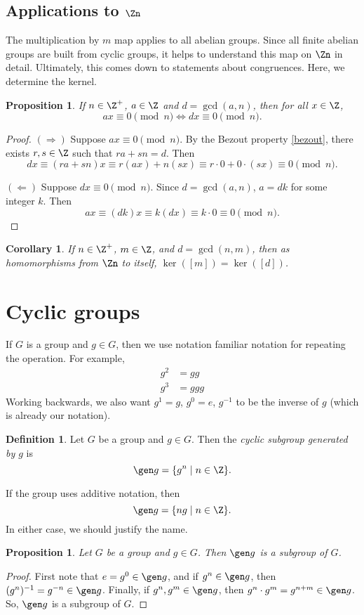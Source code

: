 \documentclass[12pt]{amsart}
\theoremstyle{plain}
\newtheorem{prop}[thm]{Proposition}
\newtheorem{cor}[thm]{Corollary}
\theoremstyle{definition}
\newtheorem{defn}[thm]{Definition}
\theoremstyle{remark}
\begin{document}
\subsection{Applications to $\Zn$}
The multiplication by $m$ map applies to all abelian groups.  Since
all finite abelian groups are built from cyclic groups, it helps to
understand this map on $\Zn$ in detail.  Ultimately, this comes down
to statements about congruences.  Here, we determine the kernel.


\begin{prop}
  If $n\in \Z^+$, $a\in \Z$ and $d=\gcd(a,n)$, then for all $x\in \Z$,
  \[ ax\equiv 0\pmod n \iff dx\equiv 0 \pmod n.\]
\end{prop}
\begin{proof}
  $(\Rightarrow)$ 
  Suppose $ax\equiv 0\pmod n$.  By the Bezout property \ref{bezout},
  there exists $r,s\in\Z$ such that $ra+sn=d$.  Then
  \[ dx\equiv (ra+sn)x \equiv r(ax)+n(sx)\equiv r\cdot 0+0\cdot
  (sx)\equiv 0 \pmod n.\]

  $(\Leftarrow)$ 
  Suppose $dx\equiv 0\pmod n$.  Since $d=\gcd(a,n)$,
  $a=dk$ for some integer $k$.  Then
  \[ ax \equiv (dk)x\equiv k(dx)\equiv k\cdot 0\equiv 0\pmod n.\]
\end{proof}

\begin{cor} \label{znkernels}
  If $n\in\Z^+$, $m\in\Z$, and $d=\gcd(n,m)$,  then as homomorphisms
  from $\Zn$ to itself, $\ker([m]) = \ker([d])$.
\end{cor}


\section{Cyclic groups}
If $G$ is a group and $g\in G$, then we use notation familiar notation
for repeating the operation.  For example,
\begin{align*}
g^2 &= gg\\
g^3&= ggg
\end{align*}
Working backwards, we also want $g^1=g$, $g^0=e$, $g^{-1}$ to be the
inverse of $g$ (which is already our notation).


\begin{defn}
  Let $G$ be a group and $g\in G$.  Then the \emph{cyclic subgroup
    generated by $g$} is
  \[ \gen g = \{ g^n\mid n\in\Z\}.\]
\end{defn}
If the group uses additive notation, then
\[ \gen g = \{ng\mid n\in\Z\}.\]
In either case, we should justify the name.
\begin{prop}
  Let $G$ be a group and $g\in G$.  Then $\gen g$ is a subgroup of $G$.
\end{prop}
\begin{proof}
  First note that $e=g^0\in \gen g$, and if $g^n\in\gen g$, then
  $(g^n)^{-1} = g^{-n}\in \gen g$.  Finally, if $g^n,g^m\in \gen g$,
  then $g^n\cdot g^m=g^{n+m}\in \gen g$.  So, $\gen g$ is a subgroup
  of $G$.
\end{proof}
\end{document}
